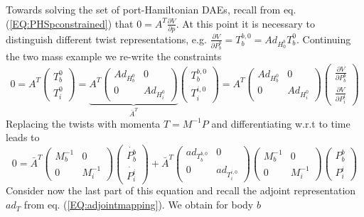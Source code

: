 \documentclass[a4paper,twoside, openright,12pt]{report}
\begin{document}
Towards solving the set of port-Hamiltonian DAEs, recall from eq. (\ref{EQ:PHSpconstrained}) that $0=A^T\frac{\partial V}{\partial p}$. At this point it is necessary to distinguish different twist representations, e.g. $\frac{\partial V}{\partial P_b^b} = T_b^{b,0} = Ad_{H_0^b}T_b^0 $. Continuing the two mass example we re-write the constraints
\begin{equation}
0 = A^T \begin{pmatrix}T_b^0 \\ T_i^0 \end{pmatrix}
 = \underbrace{A^T \begin{pmatrix}
Ad_{H_b^0} & 0 \\ 0 & Ad_{H_i^0}\end{pmatrix}}_{\bar{A}^T}
\begin{pmatrix}
T_b^{b,0} \\ T_i^{i,0}\end{pmatrix} = A^T \begin{pmatrix}
Ad_{H_b^0} & 0 \\ 0 & Ad_{H_i^0}\end{pmatrix}
\begin{pmatrix}
\frac{\partial V}{\partial P_b^b} \\
\frac{\partial V}{\partial P_i^i}
\end{pmatrix}
\end{equation}
Replacing the twists with momenta $T = M^{-1}P$ and differentiating w.r.t to time leads to
\begin{equation}
0 = \bar{A}^T\begin{pmatrix}M_b^{-1} & 0 \\ 0 & M_i^{-1}\end{pmatrix} \begin{pmatrix}\dot{P_b^b} \\ \dot{P_i^i}\end{pmatrix}
 +
\bar{A}^T \begin{pmatrix}ad_{T_b^{b,0}} & 0 \\
0 & ad_{T_i^{i,0}}\end{pmatrix}\begin{pmatrix}M_b^{-1} & 0 \\ 0 & M_i^{-1}\end{pmatrix} \begin{pmatrix}P_b^b \\ P_i^i\end{pmatrix}
\end{equation}
Consider now the last part of this equation and recall the adjoint representation $ad_T$ from eq. (\ref{EQ:adjointmapping}). We obtain for body $b$
\end{document}
